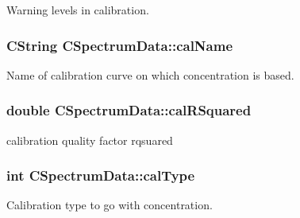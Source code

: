 Warning levels in calibration. 

\hypertarget{classCSpectrumData_ae0b7b8c53e009ebfa03064018be3884c}{
\subsubsection[{calName}]{\setlength{\rightskip}{0pt plus 5cm}CString {\bf CSpectrumData::calName}}}
\label{classCSpectrumData_ae0b7b8c53e009ebfa03064018be3884c}


Name of calibration curve on which concentration is based. 

\hypertarget{classCSpectrumData_af58a08887d61f47025a58c010e795c88}{
\subsubsection[{calRSquared}]{\setlength{\rightskip}{0pt plus 5cm}double {\bf CSpectrumData::calRSquared}}}
\label{classCSpectrumData_af58a08887d61f47025a58c010e795c88}


calibration quality factor rqsuared 

\hypertarget{classCSpectrumData_ab7bf1eda2ea2df43a5fa771b24bb18c8}{
\subsubsection[{calType}]{\setlength{\rightskip}{0pt plus 5cm}int {\bf CSpectrumData::calType}}}
\label{classCSpectrumData_ab7bf1eda2ea2df43a5fa771b24bb18c8}


Calibration type to go with concentration. 

